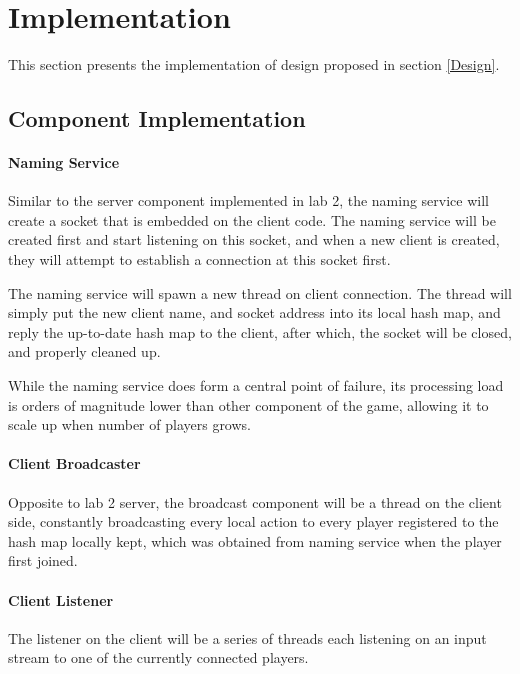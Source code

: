 \section{Implementation}\label{Impl}

This section presents the implementation of design proposed in section \ref{Design}.

\subsection{Component Implementation}\label{ImplComponent}

\paragraph*{Naming Service}

Similar to the server component implemented in lab 2, the naming service will create a socket that is embedded on the client code. The naming service will be created first and start listening on this socket, and when a new client is created, they will attempt to establish a connection at this socket first.

The naming service will spawn a new thread on client connection. The thread will simply put the new client name, and socket address into its local hash map, and reply the up-to-date hash map to the client, after which, the socket will be closed, and properly cleaned up.

While the naming service does form a central point of failure, its processing load is orders of magnitude lower than other component of the game, allowing it to scale up when number of players grows.

\paragraph*{Client Broadcaster}

Opposite to lab 2 server, the broadcast component will be a thread on the client side, constantly broadcasting every local action to every player registered to the hash map locally kept, which was obtained from naming service when the player first joined.

\paragraph*{Client Listener}

The listener on the client will be a series of threads each listening on an input stream to one of the currently connected players. 

